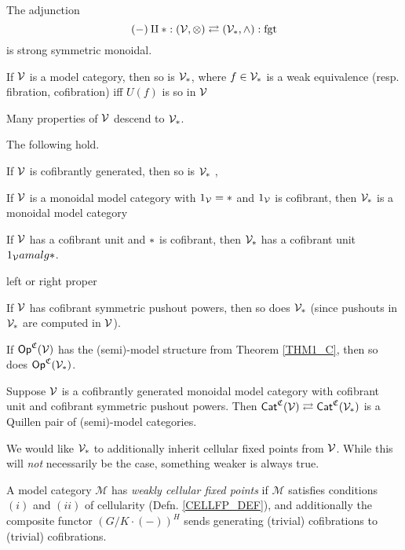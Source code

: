 \documentclass[a4paper,10pt
,draft
]{article}%
\renewcommand{\1}{\eta}%
\begin{document}
{  \begin{lemma}
        The adjunction
        \[
              (-) \amalg \**: (\V,\otimes) \rightleftarrows (\V_{\**}, \wedge) : \mathrm{fgt}
        \]
        is strong symmetric monoidal.

        If $\mathcal V$ is a model category, then so is $\V_{\**}$, where $f \in \V_{\**}$ is a weak equivalence (resp. fibration, cofibration) iff
        $U(f)$ is so in $\mathcal V$ %
  \end{lemma}

  Many properties of $\mathcal V$ descend to $\V_{\**}$. 

  \begin{lemma}
        \label{PT_PROP_LEM}
        The following hold. 
        \begin{enumerate*}[label = (\roman*)]
        \item If $\mathcal V$ is cofibrantly generated, then so is $\V_{\**}$ \cite[Lemma 2.1.21]{Hov99},
        \item If $\mathcal V$ is a monoidal model category with $1_\V = \**$ and $1_{\mathcal V}$ is cofibrant, then $\V_{\**}$ is a monoidal model category \cite[Lemma 4.2.9]{Hov99}
        \item If $\mathcal V$ has a cofibrant unit and $\**$ is cofibrant, then $\V_{\**}$ has a cofibrant unit $1_\V amalg \**$.
        \item left or right proper \cite{Hir}
        \item If $\mathcal V$ has cofibrant symmetric pushout powers, then so does $\V_{\**}$ (since pushouts in $\V_{\**}$ are computed in $\mathcal V$).
        \end{enumerate*}
  \end{lemma}

  \begin{corollary}
        If $\mathsf{Op}^{\mathfrak C}(\mathcal V)$ has the (semi)-model structure from Theorem \ref{THM1_C}, then so does $\Op^{\mathfrak C}(\V_{\**})$.     
  \end{corollary}

  \begin{lemma}
        Suppose $\mathcal V$ is a cofibrantly generated monoidal model category with cofibrant unit and cofibrant symmetric pushout powers.
        Then
        $\Cat^{\mathfrak C}(\V) \rightleftarrows \Cat^{\mathfrak C}(\V_{\**})$ is a Quillen pair of (semi)-model categories.
  \end{lemma}

  We would like $\V_{\**}$ to additionally inherit cellular fixed points from $\mathcal V$.
  While this will \textit{not} necessarily be the case, something weaker is always true.
  \begin{definition}
        A model category $\mathcal M$ has \textit{weakly cellular fixed points} if
        $\mathcal M$ satisfies conditions $(i)$ and $(ii)$ of cellularity (Defn. \ref{CELLFP_DEF}),
        and additionally the composite functor $(G/K \cdot (-))^H$ sends generating (trivial) cofibrations to (trivial) cofibrations.


\end{definition}}
\end{document}
